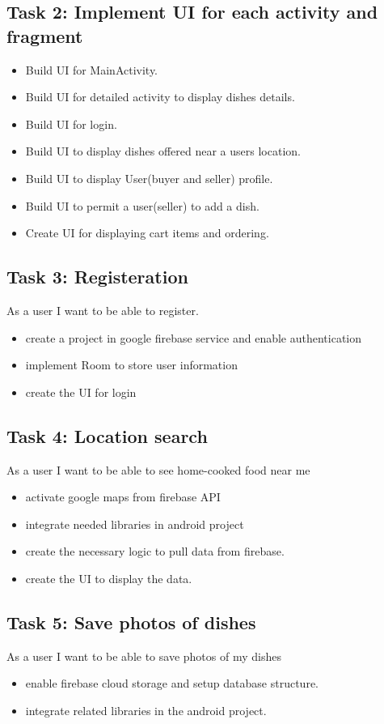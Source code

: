 \documentclass{article}
\begin{document}
\subsection{Task 2: Implement UI for each activity and fragment}
  \begin{itemize}
    \item Build UI for MainActivity.
    \item Build UI for detailed activity to display dishes details.
    \item Build UI for login.
    \item Build UI to display dishes offered near a users location.
    \item Build UI to display User(buyer and seller) profile.
    \item Build UI to permit a user(seller) to add a dish.
    \item Create UI for displaying cart items and ordering.
  \end{itemize}


\subsection{Task 3: Registeration}
	As a user I want to be able to register. 
  \begin{itemize}
    \item create a project in google firebase service and enable authentication
    \item implement Room to store user information
    \item create the UI for login
  \end{itemize}
\subsection{Task 4: Location search}
	As a user I want to be able to see home-cooked food near me 
  \begin{itemize}
    \item activate google maps from firebase API
    \item integrate needed libraries in android project
    \item create the necessary logic to pull data from firebase.
    \item create the UI to display the data.
  \end{itemize}

\subsection{Task 5: Save photos of dishes}
	As a user I want to be able to save photos of my dishes
\begin{itemize}
  \item enable firebase cloud storage and setup database structure.
  \item integrate related libraries in the android project.
\end{itemize}
\end{document}
